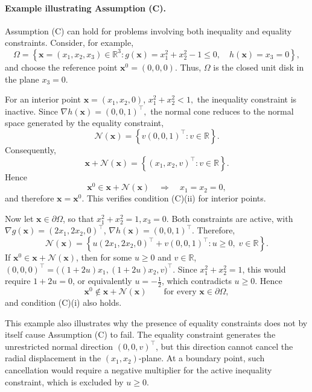\documentclass[11pt,pdflatex,sn-mathphys-ay]{sn-jnl}%
\theoremstyle{definition}
\theoremstyle{thmstyleone}%
\theoremstyle{thmstyletwo}%
\theoremstyle{thmstylethree}%
\newcommand{\add}[1]{\textcolor{revisionblue}{#1}}
\begin{document}
	\add{
		\paragraph{Example illustrating Assumption (C).}
		Assumption (C) can hold for problems involving both inequality and
		equality constraints. Consider, for example,
		\[
		\Omega
		=
		\left\{
		\bm{x}=(x_1,x_2,x_3)\in\mathbb{R}^3:
		g(\bm{x})=x_1^2+x_2^2-1\leq 0,\quad
		h(\bm{x})=x_3=0
		\right\},
		\]
		and choose the reference point $\bm{x}^0=(0,0,0).$
		Thus, $\Omega$ is the closed unit disk in the plane $x_3=0$.}
	\add{For an interior point $\bm{x}=(x_1,x_2,0)$, $x_1^2+x_2^2<1,$
		the inequality constraint is inactive. Since
		$\nabla h(\bm{x})=(0,0,1)^\top,$
		the normal cone reduces to the normal space generated by the equality
		constraint,
		\[
		\mathcal N(\bm{x})
		=
		\left\{
		v(0,0,1)^\top:v\in\mathbb{R}
		\right\}.
		\]
		Consequently,
		\[
		\bm{x}+\mathcal N(\bm{x})
		=
		\left\{
		(x_1,x_2,v)^\top:v\in\mathbb{R}
		\right\}.
		\]
		Hence
		\[
		\bm{x}^0\in\bm{x}+\mathcal N(\bm{x})
		\quad\Longrightarrow\quad
		x_1=x_2=0,
		\]
		and therefore $\bm{x}=\bm{x}^0$. This verifies condition (C)(ii)
		for interior points.}
	
	\add{Now let $\bm{x}\in\partial\Omega$, so that $x_1^2+x_2^2=1, x_3=0.$
		Both constraints are active, with 
		$\nabla g(\bm{x})=(2x_1,2x_2,0)^\top$, $\nabla h(\bm{x})=(0,0,1)^\top$.
		Therefore,
		\[
		\mathcal N(\bm{x})
		=
		\left\{
		u(2x_1,2x_2,0)^\top
		+
		v(0,0,1)^\top:
		u\geq0,\;v\in\mathbb{R}
		\right\}.
		\]
		If $\bm{x}^0\in\bm{x}+\mathcal N(\bm{x})$, then for some
		$u\geq0$ and $v\in\mathbb{R}$,
		$(0,0,0)^\top = \bigl((1+2u)x_1,(1+2u)x_2,v\bigr)^\top$.
		Since $x_1^2+x_2^2=1$, this would require
		$1+2u=0$, or equivalently $u=-\frac12$, 
		which contradicts $u\geq0$. Hence
		\[
		\bm{x}^0\notin\bm{x}+\mathcal N(\bm{x})
		\qquad
		\text{for every }\bm{x}\in\partial\Omega,
		\]
		and condition (C)(i) also holds.}
	
	\add{This example also illustrates why the presence of equality constraints
		does not by itself cause Assumption (C) to fail. The equality constraint
		generates the unrestricted normal direction $(0,0,v)^\top$, but this
		direction cannot cancel the radial displacement in the
		$(x_1,x_2)$-plane. At a boundary point, such cancellation would require
		a negative multiplier for the active inequality constraint, which is
		excluded by $u\geq0$.
	}
	
\end{document}
